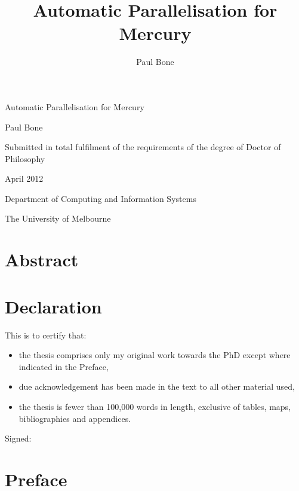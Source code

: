 \documentclass[a4paper,twoside]{report}
\title{Automatic Parallelisation for Mercury}
\author{Paul Bone}
\begin{document}
\begin{titlepage}
\begin{center}
{\LARGE Automatic Parallelisation for Mercury} \par
\vspace{1.5em}
{\Large Paul Bone} \par
\vspace{1em}
{\large Submitted in total fulfilment of the requirements of the degree of
        Doctor of Philosophy} \par
\vspace{1em}
{\large April 2012} \par
\vspace{1em}
{\large Department of Computing and Information Systems} \par
{\large The University of Melbourne} \par
\end{center}
\end{titlepage}

\chapter*{Abstract}


\chapter*{Declaration}


This is to certify that:

\begin{itemize}

    \item the thesis comprises only my original work towards the PhD except
          where indicated in the Preface,

    \item due acknowledgement has been made in the text to all other material
          used,

    \item the thesis is fewer than 100,000 words in length, exclusive of
          tables, maps, bibliographies and appendices.

\end{itemize}

\noindent Signed:

\chapter*{Preface}
\end{document}

